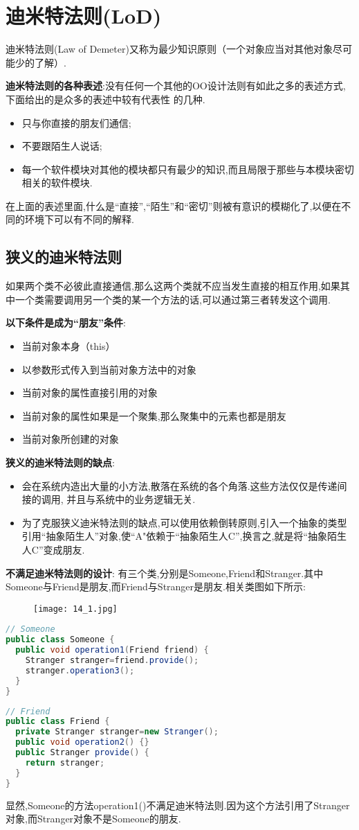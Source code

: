 \documentclass[../main.tex]{subfiles}
\begin{document}
\section{迪米特法则(LoD)}
迪米特法则(Law of Demeter)又称为最少知识原则（一个对象应当对其他对象尽可能少的了解）.

\textbf{迪米特法则的各种表述}:没有任何一个其他的OO设计法则有如此之多的表述方式,下面给出的是众多的表述中较有代表性 的几种.
\begin{itemize}
  \item 只与你直接的朋友们通信;
  \item 不要跟陌生人说话;
  \item 每一个软件模块对其他的模块都只有最少的知识,而且局限于那些与本模块密切相关的软件模块.
\end{itemize}
在上面的表述里面,什么是``直接'',``陌生''和``密切''则被有意识的模糊化了,以便在不同的环境下可以有不同的解释.
\subsection{狭义的迪米特法则}
如果两个类不必彼此直接通信,那么这两个类就不应当发生直接的相互作用,如果其中一个类需要调用另一个类的某一个方法的话,可以通过第三者转发这个调用.

\textbf{以下条件是成为``朋友''条件}:
\begin{itemize}
  \item 当前对象本身（this）
  \item 以参数形式传入到当前对象方法中的对象
  \item 当前对象的属性直接引用的对象
  \item 当前对象的属性如果是一个聚集,那么聚集中的元素也都是朋友
  \item 当前对象所创建的对象
\end{itemize}
\textbf{狭义的迪米特法则的缺点}:
\begin{itemize}
  \item 会在系统内造出大量的小方法,散落在系统的各个角落.这些方法仅仅是传递间接的调用, 并且与系统中的业务逻辑无关.
  \item 为了克服狭义迪米特法则的缺点,可以使用依赖倒转原则,引入一个抽象的类型引用``抽象陌生人''对象,使“A"依赖于``抽象陌生人C'',换言之,就是将``抽象陌生人C''变成朋友.
\end{itemize}
\textbf{不满足迪米特法则的设计}:
有三个类,分别是Someone,Friend和Stranger.其中Someone与Friend是朋友,而Friend与Stranger是朋友.相关类图如下所示:
\begin{figure}[H]
  \texttt{[image: 14\_1.jpg]}
\end{figure}
\begin{lstlisting}[language=java]
// Someone
public class Someone {
  public void operation1(Friend friend) {
    Stranger stranger=friend.provide();
    stranger.operation3();
  }
}
\end{lstlisting}
\begin{lstlisting}[language=java]
// Friend
public class Friend {
  private Stranger stranger=new Stranger();
  public void operation2() {}
  public Stranger provide() {
    return stranger;
  }
}
\end{lstlisting}
显然,Someone的方法operation1()不满足迪米特法则.因为这个方法引用了Stranger对象,而Stranger对象不是Someone的朋友.
\end{document}
